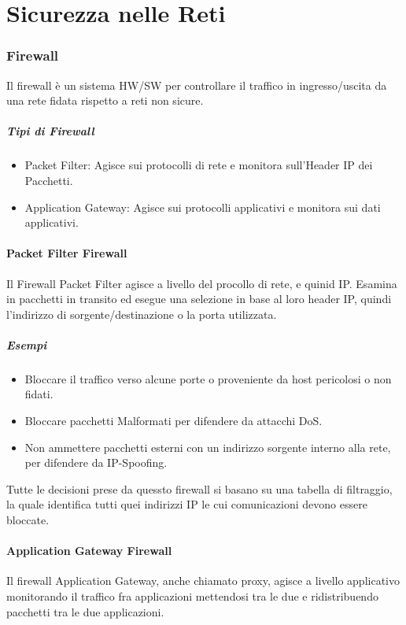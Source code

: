 \documentclass[12pt, a4paper, openany]{book}
\begin{document}
\chapter{Sicurezza nelle Reti}
\subsection{Firewall}
Il firewall è un sistema HW/SW per controllare il traffico in ingresso/uscita da una rete fidata rispetto a reti non sicure.

\paragraph*{Tipi di Firewall}
\begin{itemize}
    \item Packet Filter: Agisce sui protocolli di rete e monitora sull'Header IP dei Pacchetti.
    \item Application Gateway: Agisce sui protocolli applicativi e monitora sui dati applicativi.
\end{itemize}

\subsubsection*{Packet Filter Firewall}
Il Firewall Packet Filter agisce a livello del procollo di rete, e quinid IP.
Esamina in pacchetti in transito ed esegue una selezione in base al loro header IP, quindi l'indirizzo di sorgente/destinazione o la porta utilizzata.

\paragraph*{Esempi}
\begin{itemize}
    \item Bloccare il traffico verso alcune porte o proveniente da host pericolosi o non fidati.
    \item Bloccare pacchetti Malformati per difendere da attacchi DoS.
    \item Non ammettere pacchetti esterni con un indirizzo sorgente interno alla rete, per difendere da IP-Spoofing. 
\end{itemize}

Tutte le decisioni prese da quessto firewall si basano su una tabella di filtraggio, la quale identifica tutti quei indirizzi IP le cui comunicazioni devono essere bloccate.

\subsubsection{Application Gateway Firewall}
Il firewall Application Gateway, anche chiamato proxy, agisce a livello applicativo
monitorando il traffico fra applicazioni mettendosi tra le due e ridistribuendo pacchetti tra le due applicazioni.
\end{document}
